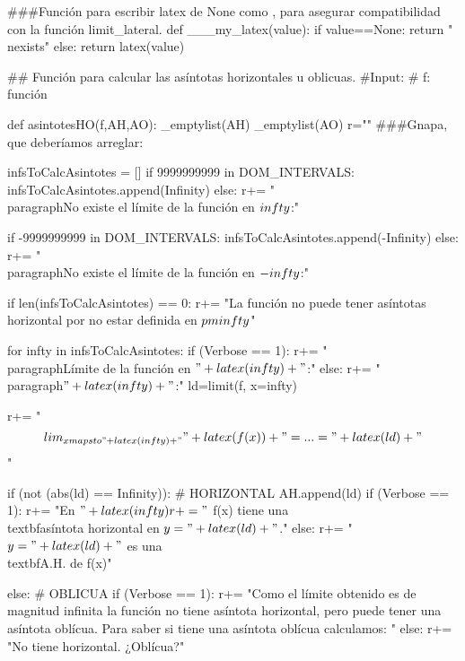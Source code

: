 \begin{sagesilent}
###Función para escribir latex de None como \nexists, para asegurar compatibilidad con la función limit_lateral.
def ___my_latex(value):
    if value==None:
        return "\\nexists"
    else:
        return latex(value)

## Función para calcular las asíntotas horizontales u oblicuas.
#Input:
# f: función

def asintotesHO(f,AH,AO):
    _emptylist(AH)
    _emptylist(AO)
    r=""
    ###Gnapa, que deberíamos arreglar:

    infsToCalcAsintotes = []
    if 9999999999 in DOM_INTERVALS:
        infsToCalcAsintotes.append(Infinity)
    else:
        r+= "\\paragraph{No existe el límite de la función en $\\infty$:}"

    if -9999999999 in DOM_INTERVALS:
        infsToCalcAsintotes.append(-Infinity)
    else:
        r+= "\\paragraph{No existe el límite de la función en $-\\infty$:}"

        
    if len(infsToCalcAsintotes) == 0:
        r+= "La función no puede tener asíntotas horizontal por no estar definida en $\\pm\\infty$"
    
    for infty in infsToCalcAsintotes:
        if (Verbose == 1):
            r+= "\\paragraph{Límite de la función en $"+latex(infty)+"$:}"
        else:
            r+= "\\paragraph{$"+latex(infty)+"$:}"
        ld=limit(f, x=infty)  

        r+= "\[\\lim_{x\\mapsto "+latex(infty)+"}" + latex(f(x)) + "= ... = "+latex(ld)+"\]"    

        if (not (abs(ld) == Infinity)): # HORIZONTAL
            AH.append(ld)
            if (Verbose == 1):
                r+= "En $"+latex(infty)
                r+= "$ f(x) tiene una \\textbf{asíntota horizontal} en $y = "+latex(ld)+"$."
            else:
                r+= "$y = "+latex(ld) +" $ es una \\textbf{A.H.} de f(x)"

        else: # OBLICUA
            if (Verbose == 1):
                r+= "Como el límite obtenido es de magnitud infinita la función no tiene asíntota horizontal, pero puede tener una asíntota oblícua. Para saber si tiene una asíntota oblícua calculamos: "
            else:
                r+= "No tiene horizontal. ¿Oblícua?"


\end{sagesilent}
